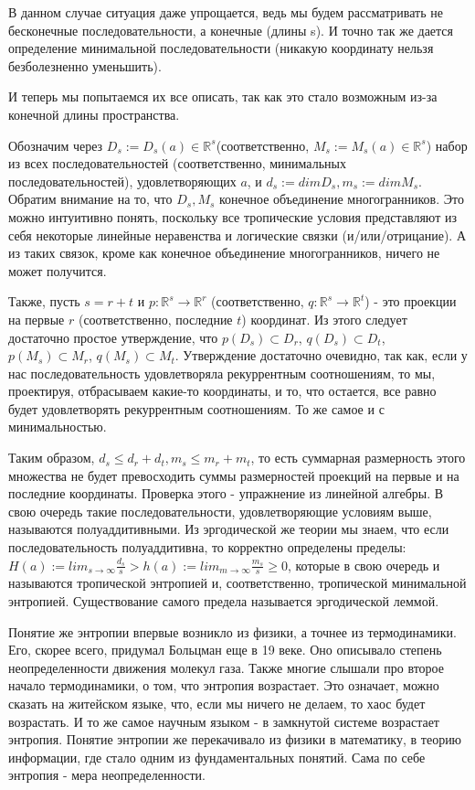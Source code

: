 \documentclass[russian]{lecture-notes}
\begin{document}
В данном случае ситуация даже упрощается, ведь мы будем рассматривать не бесконечные последовательности, а конечные (длины s). И точно так же дается определение минимальной последовательности (никакую координату нельзя безболезненно уменьшить).

И теперь мы попытаемся их все описать, так как это стало возможным из-за конечной длины пространства.

Обозначим через $D_s:=D_s(a) \in \mathbb{R}^{s}$(соответственно, $M_s:=M_s(a) \in \mathbb{R}^{s}$) набор из всех последовательностей (соответственно, минимальных последовательностей), удовлетворяющих $a$, и $d_s:=dimD_s, m_s:=dimM_s$. Обратим внимание на то, что $D_s, M_s$ конечное объединение многогранников. Это можно интуитивно понять, поскольку все тропические условия представляют из себя некоторые линейные неравенства и логические связки (и/или/отрицание). А из таких связок, кроме как конечное объединение многогранников, ничего не может получится.

Также, пусть $s=r+t$ и $p: \mathbb{R}^{s} \rightarrow \mathbb{R}^{r}$ (соответственно, $q: \mathbb{R}^{s} \rightarrow \mathbb{R}^{t}$) - это проекции на первые $r$ (соответственно, последние $t$) координат. Из этого следует достаточно простое утверждение, что $p(D_s) \subset D_r$, $q(D_s) \subset D_t$, $p(M_s) \subset M_r$, $q(M_s) \subset M_t$. Утверждение достаточно очевидно, так как, если у нас последовательность удовлетворяла рекуррентным соотношениям, то мы, проектируя, отбрасываем какие-то координаты, и то, что остается, все равно будет удовлетворять рекуррентным соотношениям. То же самое и с минимальностью.

Таким образом, $d_s \le d_r + d_t, m_s \le m_r + m_t$, то есть суммарная размерность этого множества не будет превосходить суммы размерностей проекций на первые и на последние координаты. Проверка этого - упражнение из линейной алгебры. В свою очередь такие последовательности, удовлетворяющие условиям выше, называются полуаддитивными. Из эргодической же теории мы знаем, что если последовательность полуаддитивна, то корректно определены пределы: $H(a):= lim_{s\to\infty}\frac{d_s}{s} > h(a):= lim_{m\to\infty}\frac{m_s}{s} \ge 0$, которые в свою очередь и называются тропической энтропией и, соответственно, тропической минимальной энтропией. Существование самого предела называется эргодической леммой.

Понятие же энтропии впервые возникло из физики, а точнее из термодинамики. Его, скорее всего, придумал Больцман еще в 19 веке. Оно описывало степень неопределенности движения молекул газа. Также многие слышали про второе начало термодинамики, о том, что энтропия возрастает. Это означает, можно сказать на житейском языке, что, если мы ничего не делаем, то хаос будет возрастать. И то же самое научным языком - в замкнутой системе возрастает энтропия. Понятие энтропии же перекачивало из физики в математику, в теорию информации, где стало одним из фундаментальных понятий. Сама по себе энтропия - мера неопределенности.
\end{document}
